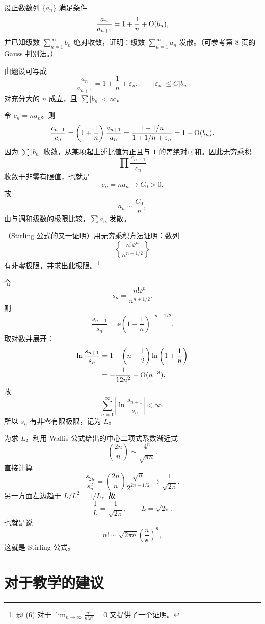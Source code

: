 \begin{xexercise}[9]
设正数数列 $\{a_n\}$ 满足条件
\[
\frac{a_n}{a_{n+1}}=1+\frac1n+\mathrm{O}(b_n),
\]
并已知级数 $\sum_{n=1}^{\infty}b_n$ 绝对收敛，证明：级数 $\sum_{n=1}^{\infty}a_n$ 发散。（可参考第 8 页的 Gauss 判别法。）
\end{xexercise}
\begin{xsolution}
由题设可写成
\[
 \frac{a_n}{a_{n+1}}
 =1+\frac1n+\varepsilon_n,
 \qquad |\varepsilon_n|\leq C|b_n|
\]
对充分大的 $n$ 成立，且 $\sum|b_n|<\infty$。

令 $c_n=na_n$。则
\[
 \frac{c_{n+1}}{c_n}
 =\left(1+\frac1n\right)\frac{a_{n+1}}{a_n}
 =\frac{1+1/n}{1+1/n+\varepsilon_n}
 =1+\mathrm{O}(b_n).
\]
因为 $\sum|b_n|$ 收敛，从某项起上述比值为正且与 $1$ 的差绝对可和。因此无穷乘积
\[
 \prod\frac{c_{n+1}}{c_n}
\]
收敛于非零有限值，也就是
\[
 c_n=na_n\longrightarrow C_0>0.
\]
故
\[
 a_n\sim\frac{C_0}{n},
\]
由与调和级数的极限比较，$\sum a_n$ 发散。
\end{xsolution}


\begin{xexercise}[10]
（Stirling 公式的又一证明）用无穷乘积方法证明：数列
\[
\left\{\frac{n!\ee^n}{n^{n+1/2}}\right\}
\]
有非零极限，并求出此极限。\footnote{题 (6) 对于 $\lim_{n\to\infty}\frac{n^n}{n!\ee^n}=0$ 又提供了一个证明。}
\end{xexercise}
\begin{xsolution}
令
\[
 s_n=\frac{n!\ee^n}{n^{n+1/2}}.
\]
则
\[
 \frac{s_{n+1}}{s_n}
 =\ee\left(1+\frac1n\right)^{-n-1/2}.
\]
取对数并展开：
\[
 \begin{aligned}
 \ln\frac{s_{n+1}}{s_n}
 &=1-\left(n+\frac12\right)\ln\left(1+\frac1n\right)\\
 &=-\frac1{12n^2}+\mathrm{O}(n^{-3}).
 \end{aligned}
\]
故
\[
 \sum_{n=1}^{\infty}\left|\ln\frac{s_{n+1}}{s_n}\right|<\infty,
\]
所以 $s_n$ 有非零有限极限，记为 $L$。

为求 $L$，利用 Wallis 公式给出的中心二项式系数渐近式
\[
 \binom{2n}{n}\sim\frac{4^n}{\sqrt{\pi n}}.
\]
直接计算
\[
 \frac{s_{2n}}{s_n^2}
 =\binom{2n}{n}\frac{\sqrt n}{2^{2n+1/2}}
 \longrightarrow\frac1{\sqrt{2\pi}}.
\]
另一方面左边趋于 $L/L^2=1/L$，故
\[
 \frac1L=\frac1{\sqrt{2\pi}},
 \qquad
 \boxed{L=\sqrt{2\pi}}.
\]
也就是说
\[
 n!\sim\sqrt{2\pi n}\left(\frac n\ee\right)^n,
\]
这就是 Stirling 公式。
\end{xsolution}


\section{对于教学的建议}

